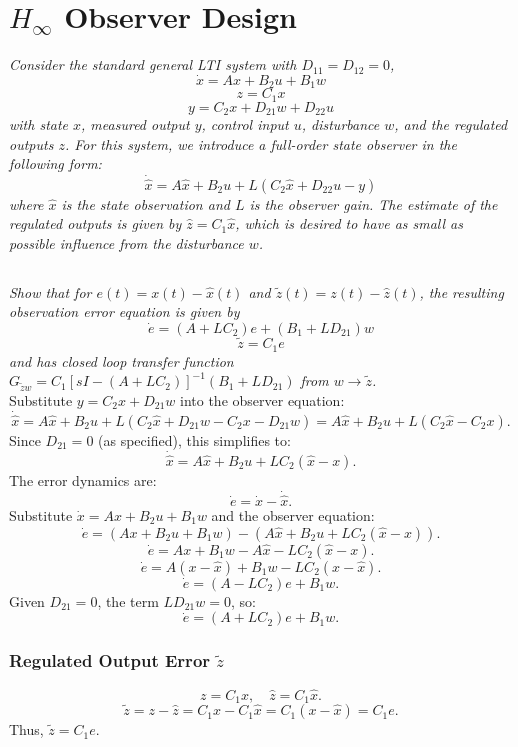 \documentclass[12pt, letterpaper]{article}
\begin{document}
\section{$H_\infty$ Observer Design}
\textit{
Consider the standard general LTI system with $D_{11} = D_{12} = 0$,
\[
\dot{x} = Ax + B_2u + B_1w
\]
\[
z = C_1x
\]
\[
y = C_2x + D_{21}w + D_{22}u
\]
with state $x$, measured output $y$, control input $u$, disturbance $w$, and the regulated outputs $z$. For this system, we introduce a full-order state observer in the following form:
\[
\dot{\hat{x}} = A\hat{x} + B_2u + L(C_2\hat{x} + D_{22}u - y)
\]
where $\hat{x}$ is the state observation and $L$ is the observer gain. The estimate of the regulated outputs is given by $\hat{z} = C_1\hat{x}$, which is desired to have as small as possible influence from the disturbance $w$.
}

\subsection{}
\textit{
Show that for $e(t) = x(t) - \hat{x}(t)$ and $\tilde{z}(t) = z(t) - \hat{z}(t)$, the resulting observation error equation is given by
\[
\dot{e} = (A + LC_2)e + (B_1 + LD_{21})w
\]
\[
\tilde{z} = C_1e
\]
and has closed loop transfer function $G_{\tilde{z}w} = C_1[sI - (A + LC_2)]^{-1}(B_1 + LD_{21})$ from $w \rightarrow \tilde{z}$.
} \\

Substitute \( y = C_2x + D_{21}w \) into the observer equation:
\[
\dot{\hat{x}} = A\hat{x} + B_2u + L(C_2\hat{x} + D_{21}w - C_2x - D_{21}w) = A\hat{x} + B_2u + L(C_2\hat{x} - C_2x).
\]
Since \( D_{21} = 0 \) (as specified), this simplifies to:
\[
\dot{\hat{x}} = A\hat{x} + B_2u + LC_2(\hat{x} - x).
\]
The error dynamics are:
\[
\dot{e} = \dot{x} - \dot{\hat{x}}.
\]
Substitute \( \dot{x} = Ax + B_2u + B_1w \) and the observer equation:
\[
\dot{e} = (Ax + B_2u + B_1w) - (A\hat{x} + B_2u + LC_2(\hat{x} - x)).
\]
\[
\dot{e} = Ax + B_1w - A\hat{x} - LC_2(\hat{x} - x).
\]
\[
\dot{e} = A(x - \hat{x}) + B_1w - LC_2(x - \hat{x}).
\]
\[
\dot{e} = (A - LC_2)e + B_1w.
\]
Given \( D_{21} = 0 \), the term \( LD_{21}w = 0 \), so:
\[
\dot{e} = (A + LC_2)e + B_1w.
\]

\subsubsection*{Regulated Output Error \( \tilde{z} \)}
\[
z = C_1x, \quad \hat{z} = C_1\hat{x}.
\]
\[
\tilde{z} = z - \hat{z} = C_1x - C_1\hat{x} = C_1(x - \hat{x}) = C_1e.
\]
Thus, \( \tilde{z} = C_1e \).
\end{document}
